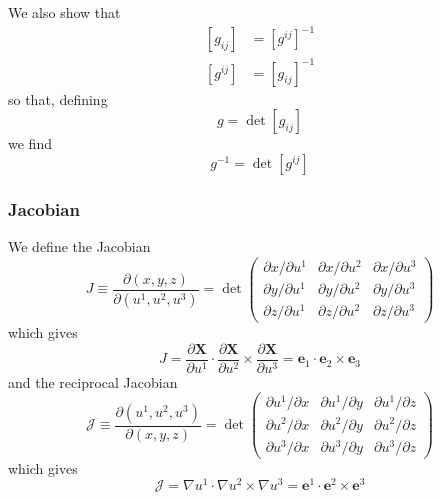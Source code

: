 We also show that 
\begin{align}
\left[ g_{ij}\right] & =\left[ g^{ij}\right] ^{-1} \\
\left[ g^{ij}\right] & =\left[ g_{ij}\right] ^{-1}
\end{align}
so that, defining 
\begin{equation}
g=\det\left[ g_{ij}\right]
\end{equation}
we find 
\begin{equation}
g^{-1}=\det\left[ g^{ij}\right]
\end{equation}

\subsubsection{Jacobian}

We define the Jacobian 
\begin{equation}
J\equiv\frac{\partial(x,y,z)}{\partial(u^{1},u^{2},u^{3})}=\det\left( 
\begin{array}{lll}
\partial x/\partial u^{1} & \partial x/\partial u^{2} & \partial x/\partial
u^{3} \\ 
\partial y/\partial u^{1} & \partial y/\partial u^{2} & \partial y/\partial
u^{3} \\ 
\partial z/\partial u^{1} & \partial z/\partial u^{2} & \partial z/\partial
u^{3}%
\end{array}
\right)
\end{equation}
which gives 
\begin{equation}
J=\frac{\partial\mathbf{X}}{\partial u^{1}}\cdot\frac{\partial\mathbf{X}}{
\partial u^{2}}\times\frac{\partial\mathbf{X}}{\partial u^{3}}=\mathbf{e}
_{1}\cdot\mathbf{e}_{2}\times\mathbf{e}_{3}
\end{equation}
and the reciprocal Jacobian 
\begin{equation}
\mathcal{J}\equiv\frac{\partial(u^{1},u^{2},u^{3})}{\partial(x,y,z)}%
=\det\left( 
\begin{array}{lll}
\partial u^{1}/\partial x & \partial u^{1}/\partial y & \partial
u^{1}/\partial z \\ 
\partial u^{2}/\partial x & \partial u^{2}/\partial y & \partial
u^{2}/\partial z \\ 
\partial u^{3}/\partial x & \partial u^{3}/\partial y & \partial
u^{3}/\partial z%
\end{array}
\right)
\end{equation}
which gives 
\begin{equation}
\mathcal{J}=\nabla u^{1}\cdot\nabla u^{2}\times\nabla u^{3}=\mathbf{e}%
^{1}\cdot\mathbf{e}^{2}\times\mathbf{e}^{3}
\end{equation}

